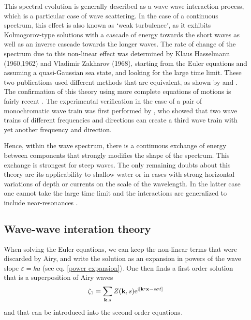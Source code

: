 This spectral evolution is generally described as a wave-wave interaction process, which is a particular case of wave scattering. In the case of a continuous 
spectrum, this effect is also known as `weak turbulence', as it exhibits Kolmogorov-type solutions with a cascade of energy towards the short waves as well as an 
inverse cascade towards the longer waves. The rate of change 
of the spectrum due to this non-linear effect was determined by Klaus
Hasselmann (1960\nocite{Hasselmann1960},1962\nocite{Hasselmann1962}) and Vladimir Zakharov
(1968\nocite{Zakharov1968}), starting from the Euler equations and assuming a quasi-Gaussian sea state, and looking for the large time limit. These two publications used different methods that are equivalent, as shown by \citet[e.g.][]{Elfouhaily&al.2000} and \citet[e.g.][]{Resio&al.2001}.
The confirmation of this theory using more complete equations of motions is fairly recent \citep{Tanaka2001b,Korotkevich&al.2008}. 
The experimental verification in the case of a pair of monochromatic wave train was first performed by \cite{McGoldrick&al.1966}, who showed that two wave trains of different 
frequencies and directions can create a third wave train with yet another frequency and direction. 

Hence, within the wave spectrum, there is a continuous exchange of energy between components that strongly modifies the shape of the spectrum. This exchange is 
strongest for steep waves. The only remaining doubts about this theory are its applicability to shallow water or in cases with strong horizontal variations of depth or currents on the scale of the wavelength. In the latter case one cannot take the large time limit and the interactions are generalized to include near-resonances \citep{Stiassnie2004,Annenkov&Shrira2006}.




\subsection{Wave-wave interation theory}
When solving the Euler equations, we can keep the non-linear terms that were discarded by Airy, 
and write the solution as an expansion in powers of the wave slope $\varepsilon = k a $ (see eq. \ref{power
expansion}).  One then finds a first order solution that is a superposition of Airy waves
\begin{equation}
 \zeta_1=\sum_{\mathbf{k},s} Z(\mathbf{k},s) \mathrm{e}^{\mathrm{i} \left[\mathbf{k} \mbox{\boldmath $\cdot$} \mathbf{x} -s \sigma t\right]}
\end{equation}
and that can be introduced into the second order equations. 

